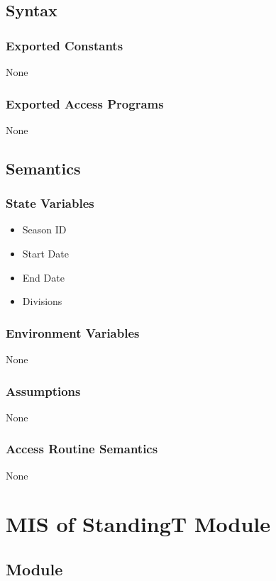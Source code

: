 \documentclass[12pt, titlepage]{article}
\begin{document}
\subsection{Syntax}

\subsubsection{Exported Constants} None

\subsubsection{Exported Access Programs} None

\subsection{Semantics}

\subsubsection{State Variables} 
\begin{itemize} 
  \item Season ID 
  \item Start Date 
  \item End Date 
  \item Divisions 
\end{itemize}

\subsubsection{Environment Variables}

None

\subsubsection{Assumptions}

None
\subsubsection{Access Routine Semantics}

None

\section{MIS of StandingT Module} 
\label{StandingT}

\subsection{Module}
\end{document}
